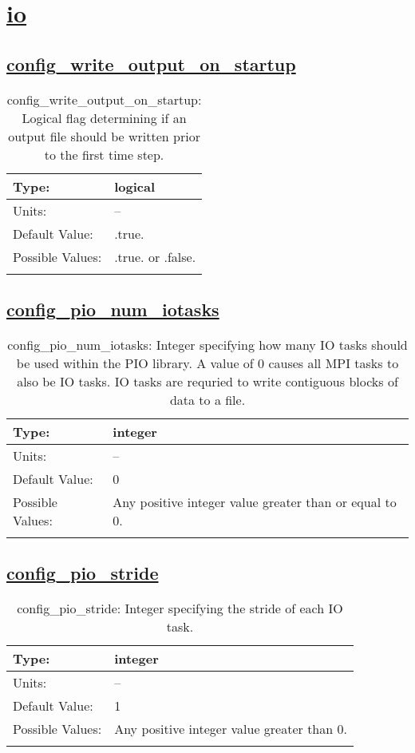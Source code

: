 \section[io]{\hyperref[sec:nm_tab_io]{io}}
\label{sec:nm_sec_io}
\subsection[config\_write\_output\_on\_startup]{\hyperref[sec:nm_tab_io]{config\_write\_output\_on\_startup}}
\label{subsec:nm_sec_config_write_output_on_startup}
\begin{center}
\begin{longtable}{| p{2.0in} || p{4.0in} |}
    \hline
    Type: & logical \\
    \hline
    Units: & -- \\
    \hline
    Default Value: & .true. \\
    \hline
    Possible Values: & .true. or .false. \\
    \hline
    \caption{config\_write\_output\_on\_startup: Logical flag determining if an output file should be written prior to the first time step.}
\end{longtable}
\end{center}
\subsection[config\_pio\_num\_iotasks]{\hyperref[sec:nm_tab_io]{config\_pio\_num\_iotasks}}
\label{subsec:nm_sec_config_pio_num_iotasks}
\begin{center}
\begin{longtable}{| p{2.0in} || p{4.0in} |}
    \hline
    Type: & integer \\
    \hline
    Units: & -- \\
    \hline
    Default Value: & 0 \\
    \hline
    Possible Values: & Any positive integer value greater than or equal to 0. \\
    \hline
    \caption{config\_pio\_num\_iotasks: Integer specifying how many IO tasks should be used within the PIO library. A value of 0 causes all MPI tasks to also be IO tasks. IO tasks are requried to write contiguous blocks of data to a file.}
\end{longtable}
\end{center}
\subsection[config\_pio\_stride]{\hyperref[sec:nm_tab_io]{config\_pio\_stride}}
\label{subsec:nm_sec_config_pio_stride}
\begin{center}
\begin{longtable}{| p{2.0in} || p{4.0in} |}
    \hline
    Type: & integer \\
    \hline
    Units: & -- \\
    \hline
    Default Value: & 1 \\
    \hline
    Possible Values: & Any positive integer value greater than 0. \\
    \hline
    \caption{config\_pio\_stride: Integer specifying the stride of each IO task.}
\end{longtable}
\end{center}
